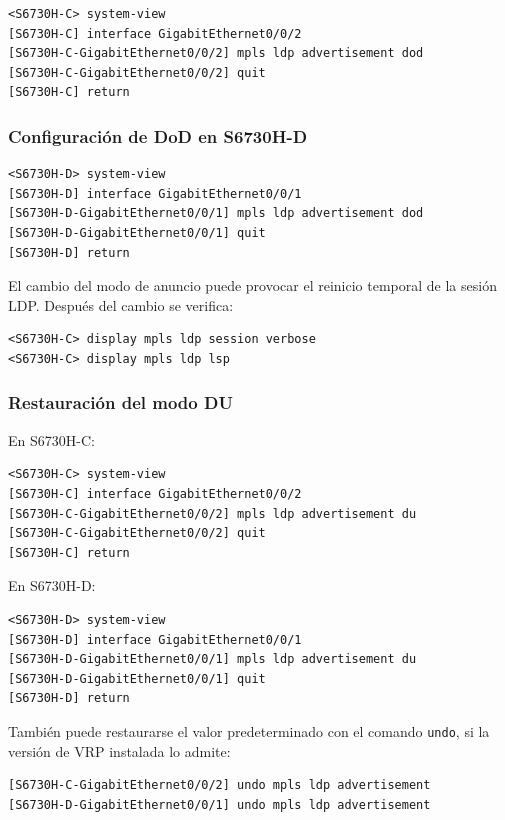 \begin{lstlisting}[style=terminal]
<S6730H-C> system-view
[S6730H-C] interface GigabitEthernet0/0/2
[S6730H-C-GigabitEthernet0/0/2] mpls ldp advertisement dod
[S6730H-C-GigabitEthernet0/0/2] quit
[S6730H-C] return
\end{lstlisting}

\subsubsection{Configuración de DoD en S6730H-D}

\begin{lstlisting}[style=terminal]
<S6730H-D> system-view
[S6730H-D] interface GigabitEthernet0/0/1
[S6730H-D-GigabitEthernet0/0/1] mpls ldp advertisement dod
[S6730H-D-GigabitEthernet0/0/1] quit
[S6730H-D] return
\end{lstlisting}

El cambio del modo de anuncio puede provocar el reinicio temporal de la
sesión LDP. Después del cambio se verifica:

\begin{lstlisting}[style=terminal]
<S6730H-C> display mpls ldp session verbose
<S6730H-C> display mpls ldp lsp
\end{lstlisting}

\subsubsection{Restauración del modo DU}

En S6730H-C:

\begin{lstlisting}[style=terminal]
<S6730H-C> system-view
[S6730H-C] interface GigabitEthernet0/0/2
[S6730H-C-GigabitEthernet0/0/2] mpls ldp advertisement du
[S6730H-C-GigabitEthernet0/0/2] quit
[S6730H-C] return
\end{lstlisting}

En S6730H-D:

\begin{lstlisting}[style=terminal]
<S6730H-D> system-view
[S6730H-D] interface GigabitEthernet0/0/1
[S6730H-D-GigabitEthernet0/0/1] mpls ldp advertisement du
[S6730H-D-GigabitEthernet0/0/1] quit
[S6730H-D] return
\end{lstlisting}

También puede restaurarse el valor predeterminado con el comando
\texttt{undo}, si la versión de VRP instalada lo admite:

\begin{lstlisting}[style=terminal]
[S6730H-C-GigabitEthernet0/0/2] undo mpls ldp advertisement
[S6730H-D-GigabitEthernet0/0/1] undo mpls ldp advertisement
\end{lstlisting}

